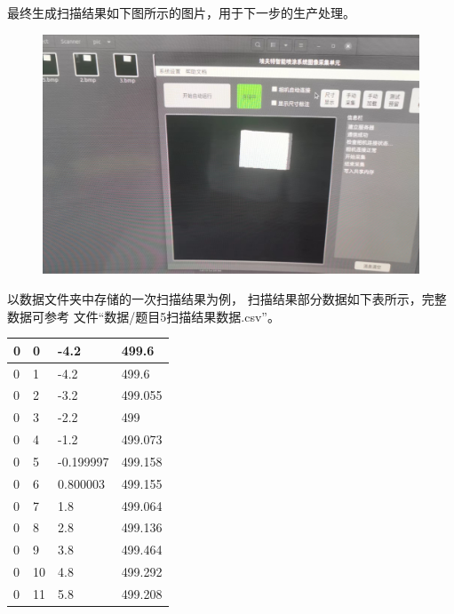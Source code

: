 \documentclass{article}
\begin{document}
最终生成扫描结果如下图所示的图片，用于下一步的生产处理。
\begin{figure}[H]
    \centering
    \includegraphics[width=.8\textwidth]{相关资源/图片/题目5扫描结果.jpg}  
\end{figure}
以数据文件夹中存储的一次扫描结果为例，
扫描结果部分数据如下表所示，完整数据可参考
文件“数据/题目5扫描结果数据.csv”。
\begin{table}[H]
    \centering
    \begin{tabular}{|l|l|l|l|}
    \hline
        0 & 0 & -4.2 & 499.6 \\ \hline
        0 & 1 & -4.2 & 499.6 \\ \hline
        0 & 2 & -3.2 & 499.055 \\ \hline
        0 & 3 & -2.2 & 499 \\ \hline
        0 & 4 & -1.2 & 499.073 \\ \hline
        0 & 5 & -0.199997 & 499.158 \\ \hline
        0 & 6 & 0.800003 & 499.155 \\ \hline
        0 & 7 & 1.8 & 499.064 \\ \hline
        0 & 8 & 2.8 & 499.136 \\ \hline
        0 & 9 & 3.8 & 499.464 \\ \hline
        0 & 10 & 4.8 & 499.292 \\ \hline
        0 & 11 & 5.8 & 499.208 \\ \hline
    \end{tabular}
\end{table}
\end{document}
